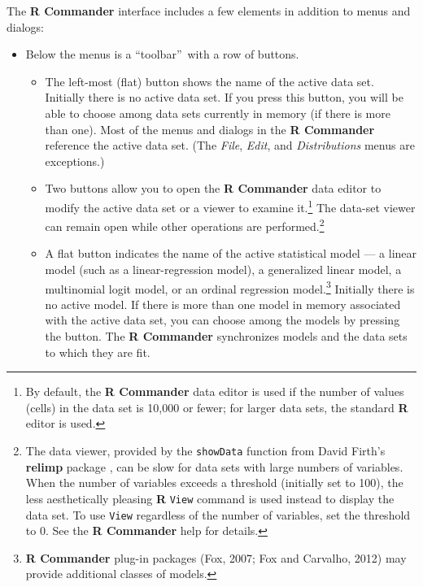 \documentclass{article}%
\begin{document}
The \textbf{R Commander} interface includes a few elements in addition to
menus and dialogs:

\begin{itemize}
\item Below the menus is a \textquotedblleft toolbar\textquotedblright\ with a
row of buttons.

\begin{itemize}
\item The left-most (flat) button shows the name of the active data set.
Initially there is no active data set. If you press this button, you will be
able to choose among data sets currently in memory (if there is more than
one). Most of the menus and dialogs in the \textbf{R Commander} reference the
active data set. (The \emph{File}, \emph{Edit}, and \emph{Distributions} menus
are exceptions.)

\item Two buttons allow you to open the \textbf{R Commander} data editor to modify the
active data set or a viewer to examine it.\footnote{By default, the \textbf{R Commander} data editor
is used if the number of values (cells) in the data set is 10,000 or fewer; for larger data sets,
the standard \textbf{R} editor is used.} The data-set viewer can remain open
while other operations are performed.\footnote{The data viewer, provided by
the \texttt{showData} function from David Firth's \textbf{relimp}
package \citep{Firth16}, can be slow for data sets with large numbers of
variables. When the number of variables exceeds a threshold (initially set to
100), the less aesthetically pleasing \textbf{R} \texttt{View} command is used
instead to display the data set. To use \texttt{View} regardless of the number
of variables, set the threshold to 0. See the \textbf{R Commander} help for
details.}

\item A flat button indicates the name of the active statistical model --- a
linear model (such as a linear-regression model), a generalized linear model,
a multinomial logit model, or an ordinal regression model.\footnote{\textbf{R
Commander} plug-in packages (Fox, 2007; Fox and Carvalho, 2012) may provide
additional classes of models.} Initially there is no active model. If there is
more than one model in memory associated with the active data set, you can
choose among the models by pressing the button. The \textbf{R Commander}
synchronizes models and the data sets to which they are fit.
\end{itemize}


\end{itemize}
\end{document}
